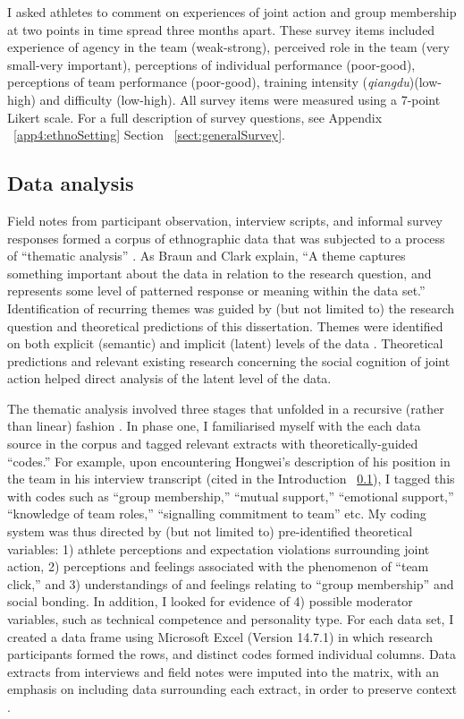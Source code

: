 \begin{CJK}{UTF8}{gbsn}
    I asked athletes to comment on experiences of joint action and group membership at two points in time spread three months apart.  These survey items included experience of agency in the team (weak-strong), perceived role in the team (very small-very important), perceptions of individual performance (poor-good), perceptions of team performance (poor-good), training intensity (\textit{qiangdu})(low-high) and difficulty (low-high).  All survey items were measured using a 7-point Likert scale. For a full description of survey questions, see Appendix ~\ref{app4:ethnoSetting} Section ~\ref{sect:generalSurvey}.



\subsection{Data analysis\label{sect:dataAnalysis}}
Field notes from participant observation, interview scripts, and informal survey responses formed a corpus of ethnographic data that was subjected to a process of ``thematic analysis'' \citep{Braun2006}.  As Braun and Clark \textcite[10]{Braun2006} explain, ``A theme captures something important about the data in relation to the research question, and represents some level of patterned response or meaning within the data set.''  Identification of recurring themes was guided by (but not limited to) the research question and theoretical predictions of this dissertation.  Themes were identified on both explicit (semantic) and implicit (latent) levels of the data \citep{Boyatzis1998}.  Theoretical predictions and relevant existing research concerning the social cognition of joint action helped direct analysis of the latent level of the data.

The thematic analysis involved three stages that unfolded in a recursive (rather than linear) fashion \citep{Braun2006}. In phase one, I familiarised myself with the each data source in the corpus and tagged relevant extracts with theoretically-guided ``codes.'' For example, upon encountering Hongwei's description of his position in the team in his interview transcript (cited in the Introduction ~\ref{}), I tagged this with codes such as ``group membership,'' ``mutual support,'' ``emotional support,'' ``knowledge of team roles,'' ``signalling commitment to team'' etc.  My coding system was thus directed by (but not limited to) pre-identified theoretical variables: 1) athlete perceptions and expectation violations surrounding joint action, 2) perceptions and feelings associated with the phenomenon of ``team click,'' and 3) understandings of and feelings relating to ``group membership'' and social bonding.  In addition, I looked for evidence of 4) possible moderator variables, such as technical competence and personality type.  For each data set, I created a data frame using Microsoft Excel (Version 14.7.1) in which research participants formed the rows, and distinct codes formed individual columns. Data extracts from interviews and field notes were imputed into the matrix, with an emphasis on including data surrounding each extract, in order to preserve context \citep[see][]{Bryman2001}.


\end{CJK}
